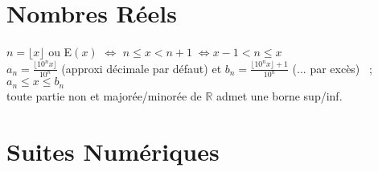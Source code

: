 \documentclass[12 pt]{exampleclass}
\begin{document}
\section{Nombres Réels}

\begin{flushleft}
\begin{doublespace}

	$n= \lfloor x \rfloor$ ou E$(x)$ $\Leftrightarrow$ \; $n\leq x < n+1 \; \Leftrightarrow x-1 < n \leq x$\\
	$a_n = \frac{\lfloor 10^n x \rfloor}{10^n}$ (approxi décimale par défaut) et $b_n = \frac{\lfloor 10^n x \rfloor + 1}{10^n}$ (... par excès) \ ; $a_n\leq x \leq b_n$\\
	toute partie non et majorée/minorée de $\mathbb{R}$ admet une borne sup/inf.\\

\end{doublespace}
\end{flushleft}

\newpage
\section{Suites Numériques}
\end{document}
